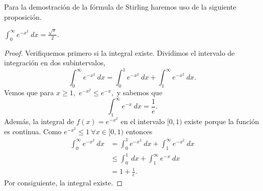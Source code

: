 Para la demostración de la fórmula de Stirling haremos uso de la siguiente proposición.
\begin{proposition}
	$\int_{0}^{\infty}e^{-x^2}\ dx = \frac{\sqrt{\pi}}{2}.$
\end{proposition}
\begin{proof}
	Verifiquemos primero si la integral existe. Dividimos el intervalo de integración en dos subintervalos, $$\int_{0}^{\infty}e^{-x^2}\ dx = \int_{0}^{1}e^{-x^2}\ dx+\int_{1}^{\infty}e^{-x^2}\ dx.$$ Vemos que para $x \geq 1,$ $e^{-x^2} \leq e^{-x},$ y sabemos que $$\int_{1}^{\infty}e^{-x}\ dx = \frac{1}{e}.$$
	Además, la integral de $f(x) = e^{-x^2}$ en el intervalo $[0,1)$ existe porque la función es continua. Como $e^{-x^2} \leq 1\ \forall x \in [0,1)$ entonces
	\begin{align*}
		\int_{0}^{\infty}e^{-x^2}\ dx &= \int_{0}^{1}e^{-x^2}\ dx+\int_{1}^{\infty}e^{-x^2}\ dx\\
		&\leq \int_{0}^{1}\ dx+\int_{1}^{\infty}e^{-x}\ dx\\
		&= 1+\frac{1}{e}.
	\end{align*}
	Por consiguiente, la integral existe.
	

\end{proof}
